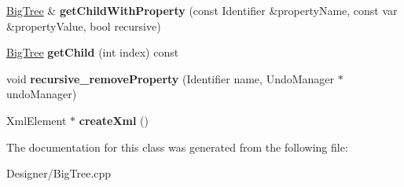 \begin{DoxyCompactItemize}
\item 
\hypertarget{class_big_tree_a2e9da63624e0c7982e12aab3f1361f32}{\hyperlink{class_big_tree}{Big\-Tree} \& {\bfseries get\-Child\-With\-Property} (const Identifier \&property\-Name, const var \&property\-Value, bool recursive)}\label{class_big_tree_a2e9da63624e0c7982e12aab3f1361f32}

\item 
\hypertarget{class_big_tree_ac2c384997bb5faf0d18e6852c3eb2941}{\hyperlink{class_big_tree}{Big\-Tree} {\bfseries get\-Child} (int index) const }\label{class_big_tree_ac2c384997bb5faf0d18e6852c3eb2941}

\item 
\hypertarget{class_big_tree_a47a9f19b49792e570174ff0773ba1d78}{void {\bfseries recursive\-\_\-remove\-Property} (Identifier name, Undo\-Manager $\ast$undo\-Manager)}\label{class_big_tree_a47a9f19b49792e570174ff0773ba1d78}

\item 
\hypertarget{class_big_tree_af7fff16ebcf45fe76905e025e25f5442}{Xml\-Element $\ast$ {\bfseries create\-Xml} ()}\label{class_big_tree_af7fff16ebcf45fe76905e025e25f5442}

\end{DoxyCompactItemize}


The documentation for this class was generated from the following file\-:\begin{DoxyCompactItemize}
\item 
Designer/Big\-Tree.\-cpp\end{DoxyCompactItemize}
